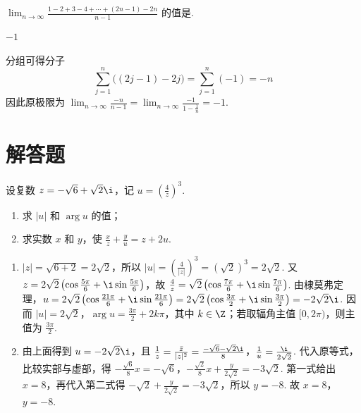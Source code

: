\documentclass[UTF8,a4paper,oneside,11pt]{ctexbook}
\begin{document}
\begin{problem}
\(\displaystyle\lim_{n \to \infty}\frac{1 - 2 + 3 - 4 + \cdots + (2n - 1) - 2n}{n - 1}\) 的值是\fillinblank{}.
\end{problem}

\begin{answer}
\(-1\)
\end{answer}

\begin{solution}
分组可得分子
\[
\sum_{j=1}^{n}\bigl((2j-1)-2j\bigr)=\sum_{j=1}^{n}(-1)=-n
\]
因此原极限为 \(\displaystyle\lim_{n\to\infty}\frac{-n}{n-1}=\lim_{n\to\infty}\frac{-1}{1-\frac{1}{n}}=-1\).
\end{solution}

\section{解答题}

\begin{problem}
设复数 \(z = -\sqrt{6} + \sqrt{2}\i\)，记 \(u = \left(\frac{4}{z}\right)^3\).
\begin{enumerate}
\item 求 \(|u|\) 和 \(\arg u\) 的值；
\item 求实数 \(x\) 和 \(y\)，使 \(\frac{x}{z} + \frac{y}{u} = z + 2u\).
\end{enumerate}
\end{problem}

\begin{solution}
\begin{enumerate}
\item \(|z|=\sqrt{6+2}=2\sqrt2\)，所以 \(|u|=\left(\frac4{|z|}\right)^3=\left(\sqrt2\right)^3=2\sqrt2\). 又 \(z=2\sqrt2\left(\cos\frac{5\pi}{6}+\i\sin\frac{5\pi}{6}\right)\)，故 \(\frac4z=\sqrt2\left(\cos\frac{7\pi}{6}+\i\sin\frac{7\pi}{6}\right)\). 由棣莫弗定理，\(u=2\sqrt2\left(\cos\frac{21\pi}{6}+\i\sin\frac{21\pi}{6}\right)=2\sqrt2\left(\cos\frac{3\pi}{2}+\i\sin\frac{3\pi}{2}\right)=-2\sqrt2\i\). 因而 \(|u|=2\sqrt2\)，\(\arg u=\frac{3\pi}{2}+2k\pi\)，其中 \(k\in\Z\)；若取辐角主值 \([0,2\pi)\)，则主值为 \(\frac{3\pi}{2}\).
\item 由上面得到 \(u=-2\sqrt2\i\)，且 \(\frac1z=\frac{\bar z}{|z|^2}=\frac{-\sqrt6-\sqrt2\i}{8}\)，\(\frac1u=\frac{\i}{2\sqrt2}\). 代入原等式，比较实部与虚部，得
\(-\frac{\sqrt6}{8}x=-\sqrt6\)，\(-\frac{\sqrt2}{8}x+\frac{y}{2\sqrt2}=-3\sqrt2\).
第一式给出 \(x=8\)，再代入第二式得 \(-\sqrt2+\frac{y}{2\sqrt2}=-3\sqrt2\)，所以 \(y=-8\). 故 \(x=8\)，\(y=-8\).
\end{enumerate}
\end{solution}
\end{document}
